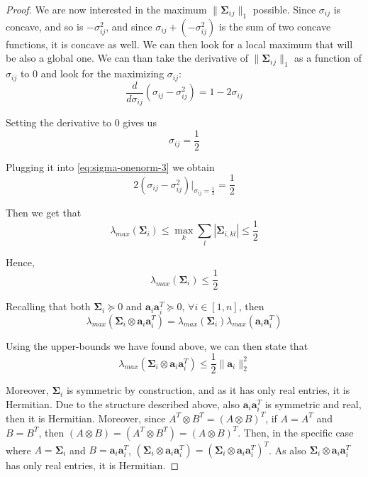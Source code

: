 \documentclass[12pt]{article}
\newcommand{\aat}{\mathbf{a}_{i} \mathbf{a}_{i}^{T}}
\newcommand{\bigsigma}{\mathbf{\Sigma}_{i}}
\begin{document}
\begin{proof}
We are now interested in the maximum $\lVert \bigsigma{}_{j} \rVert_{1}$ possible. Since $\sigma_{ij}$ is concave, and so is $-\sigma_{ij}^{2}$, and since $\sigma_{ij} + (-\sigma_{ij}^{2})$ is the sum of two concave functions, it is concave as well. We can then look for a local maximum that will be also a global one. We can than take the derivative of $ \lVert \bigsigma{}_{j} \rVert_{1}$ as a function of $\sigma_{ij}$ to 0 and look for the maximizing $\sigma_{ij}$:
\begin{equation}
    \frac{d}{d\sigma_{ij}}(\sigma_{ij} - \sigma_{ij}^{2}) =  1 - 2 \sigma_{ij}
\end{equation}

Setting the derivative to 0 gives us
\begin{equation}
    \sigma_{ij} = \frac{1}{2}
\end{equation}

Plugging it into \eqref{eq:sigma-onenorm-3} we obtain
\begin{equation}
    2(\sigma_{ij} - \sigma_{ij}^{2}) | _{\sigma_{ij} = \frac{1}{2}} = \frac{1}{2}
\end{equation}

Then we get that
\begin{equation}
    \lambda_{max}(\bigsigma) \leq \max_{k} \sum_{l} |\mathbf{\Sigma}_{i,kl}| \leq \frac{1}{2}
\end{equation}

Hence,
\begin{equation}
    \lambda_{max}(\bigsigma) \leq \frac{1}{2}
\end{equation}

Recalling that both $\bigsigma \succeq 0$ and $\aat \succeq 0$, $\forall i \in [1, n]$, then
\begin{equation}
    \lambda_{max}(\bigsigma \otimes \aat) = \lambda_{max}(\bigsigma) \lambda_{max}(\aat)
\end{equation}

Using the upper-bounds we have found above, we can then state that
\begin{equation}
    \lambda_{max}(\bigsigma \otimes \aat) \leq \frac{1}{2} \lVert \mathbf{a}_i \rVert_{2}^{2}
\end{equation}

Moreover, $\bigsigma$ is symmetric by construction, and as it has only real entries, it is Hermitian. Due to the structure described above, also $\aat$ is symmetric and real, then it is Hermitian. Moreover, since $A^T \otimes B^T = (A \otimes B)^T$, if $A = A^T$ and $B = B^T$, then $(A \otimes B) = (A^T \otimes B^T) = (A \otimes B)^T$. Then, in the specific case where $A = \bigsigma$ and $B = \aat$, $(\bigsigma \otimes \aat) = (\bigsigma \otimes \aat)^T$. As also $\bigsigma \otimes \aat$ has only real entries, it is Hermitian.


\end{proof}
\end{document}

